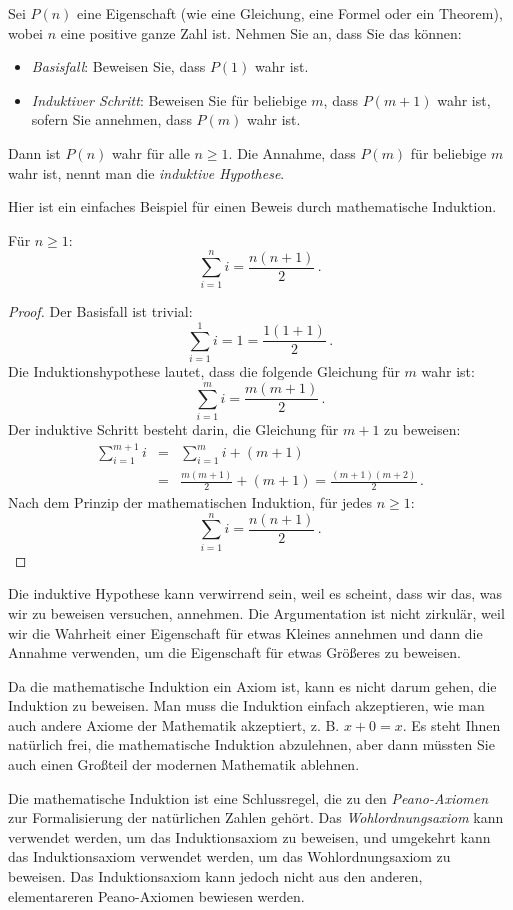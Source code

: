\begin{axiom}
Sei $P(n)$ eine Eigenschaft (wie eine Gleichung, eine Formel oder ein Theorem), wobei $n$ eine positive ganze Zahl ist. Nehmen Sie an, dass Sie das können:
\begin{itemize}
\item \emph{Basisfall}: Beweisen Sie, dass $P(1)$ wahr ist.
\item \emph{Induktiver Schritt}: Beweisen Sie für beliebige $m$, dass $P(m+1)$ wahr ist, sofern Sie annehmen, dass $P(m)$ wahr ist.
\end{itemize}
Dann ist $P(n)$ wahr für alle $n\geq 1$.
Die Annahme, dass $P(m)$ für beliebige $m$ wahr ist, nennt man die \emph{induktive Hypothese}.
\end{axiom}
Hier ist ein einfaches Beispiel für einen Beweis durch mathematische Induktion.
\begin{theorem}\label{t.sum}
Für $n\geq 1$:
\[
\sum_{i=1}^n i = \frac{n(n+1)}{2}\,.
\]
\end{theorem}

\begin{proof} Der Basisfall ist trivial:
\[
\sum_{i=1}^1 i = 1 =\frac{1(1+1)}{2}\,.
\]
Die Induktionshypothese lautet, dass die folgende Gleichung für $m$ wahr ist:
\[
\sum_{i=1}^{m} i = \frac{m(m+1)}{2}\,.
\]
Der induktive Schritt besteht darin, die Gleichung für $m+1$ zu beweisen:
\begin{eqnarray*}
\sum_{i=1}^{m+1} i &=& \sum_{i=1}^m i + (m+1)\label{l.sum1}\\
&=&\frac{m(m+1)}{2} + (m+1)\label{l.sum2}
=\frac{(m+1)(m+2)}{2}\,.\label{l.sum4}
\end{eqnarray*}
Nach dem Prinzip der mathematischen Induktion, für jedes $n\geq 1$:
\[
\sum_{i=1}^n i = \frac{n(n+1)}{2}\,.
\]
\end{proof}

Die induktive Hypothese kann verwirrend sein, weil es scheint, dass wir das, was wir zu beweisen versuchen, annehmen. Die Argumentation ist nicht zirkulär, weil wir die Wahrheit einer Eigenschaft für etwas Kleines annehmen und dann die Annahme verwenden, um die Eigenschaft für etwas Größeres zu beweisen.

Da die mathematische Induktion ein Axiom ist, kann es nicht darum gehen, die Induktion zu beweisen. Man muss die Induktion einfach akzeptieren, wie man auch andere Axiome der Mathematik akzeptiert, z. B. $x+0=x$. Es steht Ihnen natürlich frei, die mathematische Induktion abzulehnen, aber dann müssten Sie auch einen Großteil der modernen Mathematik ablehnen.
\begin{advanced}
Die mathematische Induktion ist eine Schlussregel, die zu den \emph{Peano-Axiomen} zur Formalisierung der natürlichen Zahlen gehört. Das \emph{Wohlordnungsaxiom} kann verwendet werden, um das Induktionsaxiom zu beweisen, und umgekehrt kann das Induktionsaxiom verwendet werden, um das Wohlordnungsaxiom zu beweisen. Das Induktionsaxiom kann jedoch nicht aus den anderen, elementareren Peano-Axiomen bewiesen werden.
\end{advanced}

